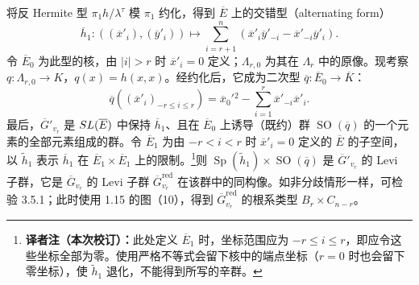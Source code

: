 将反 Hermite 型 $\pi_1h/\lambda^\tau$ 模 $\pi_1$ 约化，得到 $\overline E$ 上的交错型（alternating form）
\[
\overline h_1:((\overline x'_i),(\overline y'_i))\longmapsto
\sum_{i=r+1}^n(\overline x'_i\overline y'_{-i}-\overline x'_{-i}\overline y'_i).
\]
令 $\overline E_0$ 为此型的核，由 $|i|>r$ 时 $\overline x'_i=0$ 定义；$\Lambda_{r,0}$ 为其在 $\Lambda_r$ 中的原像。现考察 $q:\Lambda_{r,0}\to K$，$q(x)=h(x,x)$。经约化后，它成为二次型 $\overline q:\overline E_0\to\overline K$：
\[
\overline q((\overline x'_i)_{-r\leq i\leq r})=\overline x_0'{}^2-
\sum_{i=1}^r\overline x'_{-i}\overline x'_i.
\]
最后，$\overline G'_{v_r}$ 是 $SL(\overline E)$ 中保持 $\overline h_1$、且在 $\overline E_0$ 上诱导（既约）群 $\operatorname{SO}(\overline q)$ 的一个元素的全部元素组成的群。令 $\overline E_1$ 为由 $-r<i<r$ 时 $\overline x'_i=0$ 定义的 $\overline E$ 的子空间，以 $\widetilde h_1$ 表示 $\overline h_1$ 在 $\overline E_1\times\overline E_1$ 上的限制。\footnote{\textbf{译者注（本次校订）：}此处定义 $\overline E_1$ 时，坐标范围应为 $-r\le i\le r$，即应令这些坐标全部为零。使用严格不等式会留下核中的端点坐标（$r=0$ 时也会留下零坐标），使 $\widetilde h_1$ 退化，不能得到所写的辛群。}则 $\operatorname{Sp}(\widetilde h_1)\times\operatorname{SO}(\overline q)$ 是 $\overline G'_{v_r}$ 的 Levi 子群，它是 $\overline G_{v_r}$ 的 Levi 子群 $\overline G_{v_r}^{\mathrm{red}}$ 在该群中的同构像。如非分歧情形一样，可检验 3.5.1；此时使用 1.15 的图（10），得到 $\overline G_{v_r}^{\mathrm{red}}$ 的根系类型 $B_r\times C_{n-r}$。

